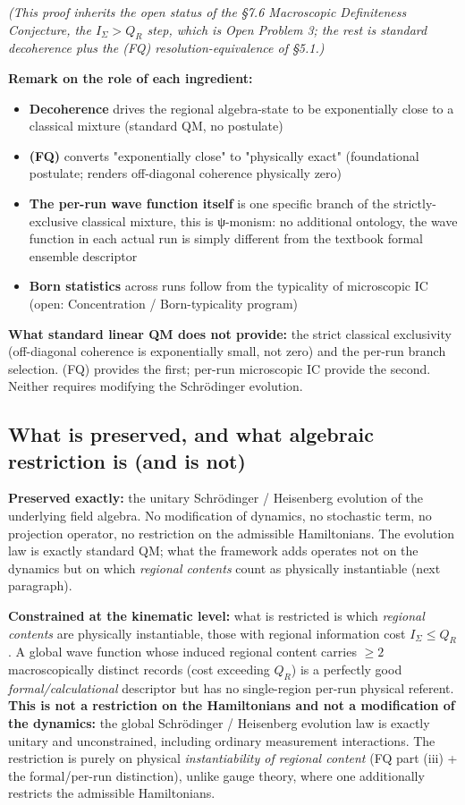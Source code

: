 \documentclass[11pt,a4paper]{article}
\begin{document}
\emph{(This proof inherits the open status of the §7.6 Macroscopic Definiteness Conjecture, the $I_\Sigma > Q_R$ step, which is Open Problem 3; the rest is standard decoherence plus the (FQ) resolution-equivalence of §5.1.)}

\textbf{Remark on the role of each ingredient:}
\begin{itemize}
  \item \textbf{Decoherence} drives the regional algebra-state to be exponentially close to a classical mixture (standard QM, no postulate)
  \item \textbf{(FQ)} converts "exponentially close" to "physically exact" (foundational postulate; renders off-diagonal coherence physically zero)
  \item \textbf{The per-run wave function itself} is one specific branch of the strictly-exclusive classical mixture, this is ψ-monism: no additional ontology, the wave function in each actual run is simply different from the textbook formal ensemble descriptor
  \item \textbf{Born statistics} across runs follow from the typicality of microscopic IC (open: Concentration / Born-typicality program)
\end{itemize}

\textbf{What standard linear QM does not provide:} the strict classical exclusivity (off-diagonal coherence is exponentially small, not zero) and the per-run branch selection. (FQ) provides the first; per-run microscopic IC provide the second. Neither requires modifying the Schrödinger evolution.

\subsection{What is preserved, and what algebraic restriction is (and is not)}

\textbf{Preserved exactly:} the unitary Schrödinger / Heisenberg evolution of the underlying field algebra. No modification of dynamics, no stochastic term, no projection operator, no restriction on the admissible Hamiltonians. The evolution law is exactly standard QM; what the framework adds operates not on the dynamics but on which \emph{regional contents} count as physically instantiable (next paragraph).

\textbf{Constrained at the kinematic level:} what is restricted is which \emph{regional contents} are physically instantiable, those with regional information cost $I_\Sigma \le Q_R$. A global wave function whose induced regional content carries $\ge 2$ macroscopically distinct records (cost exceeding $Q_R$) is a perfectly good \emph{formal/calculational} descriptor but has no single-region per-run physical referent. \textbf{This is not a restriction on the Hamiltonians and not a modification of the dynamics:} the global Schrödinger / Heisenberg evolution law is exactly unitary and unconstrained, including ordinary measurement interactions. The restriction is purely on physical \emph{instantiability of regional content} (FQ part (iii) + the formal/per-run distinction), unlike gauge theory, where one additionally restricts the admissible Hamiltonians.
\end{document}
